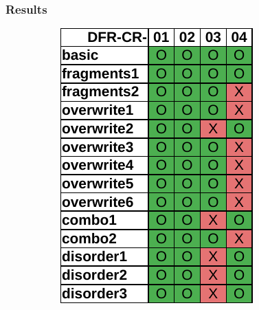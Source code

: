 \subsubsection{Results}

\begin{figure}
    \centering

    \begin{subfigure}[t]{0.3\linewidth}
        \includegraphics[width=\linewidth]{fig/autopsy_results_fat.pdf}
    \end{subfigure}~~
    \begin{subfigure}[t]{0.3\linewidth}

\end{subfigure}
\end{figure}
